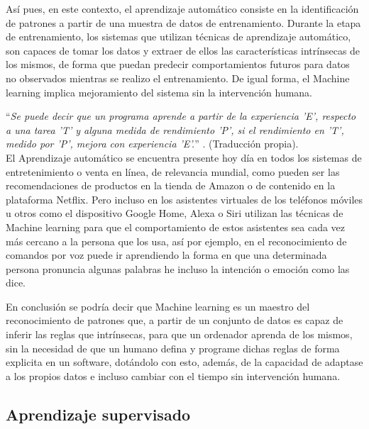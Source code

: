         Así pues, en este contexto, el aprendizaje automático consiste en la identificación de patrones a partir de una muestra de datos de entrenamiento. Durante la etapa de entrenamiento, los sistemas que utilizan técnicas de aprendizaje automático, son capaces de tomar los datos y extraer de ellos las características intrínsecas de los mismos, de forma que puedan predecir comportamientos futuros para datos no observados mientras se realizo el entrenamiento. De igual forma, el Machine learning implica mejoramiento del sistema sin la intervención humana.
        
        ``\textit{Se puede decir que un programa aprende a partir de la experiencia 'E', respecto a una tarea 'T' y alguna medida de rendimiento 'P', si el rendimiento en 'T', medido por 'P', mejora con experiencia 'E'.}'' \cite{Mitchell1997}. (Traducción propia). \\
        
        El Aprendizaje automático  se encuentra presente hoy día en todos los sistemas de entretenimiento o venta en línea, de relevancia mundial, como pueden ser las recomendaciones de productos en la tienda de Amazon o de contenido en la plataforma Netflix. Pero incluso en los asistentes virtuales de los teléfonos móviles u otros como el dispositivo Google Home, Alexa o Siri utilizan las técnicas de Machine learning para que el comportamiento de estos asistentes sea cada vez más cercano a la persona que los usa, así por ejemplo, en el reconocimiento de comandos por voz puede ir aprendiendo la forma en que una determinada persona pronuncia algunas palabras he incluso la intención o emoción como las dice.
        
        En conclusión se podría decir que Machine learning es un maestro del reconocimiento de patrones que, a partir de un conjunto de datos es capaz de inferir las reglas que intrínsecas, para que un ordenador aprenda de los mismos, sin la necesidad de que un humano defina y programe dichas reglas de forma explicita en un software, dotándolo con esto, además, de la capacidad de adaptase a los propios datos e incluso cambiar con el tiempo sin intervención humana.
    
    \subsection{Aprendizaje supervisado}
    \label{sub:FrameSupervisedLearnig}
    
